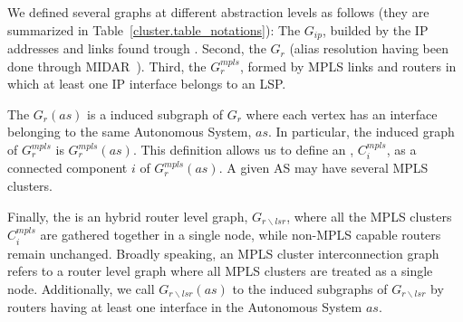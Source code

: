 We defined several graphs at different abstraction levels as follows (they are
summarized in Table~\ref{cluster.table_notations}): The  $G_{ip}$, builded
by the IP addresses and links found trough
\traceroute. Second, the  $G_{r}$ (alias resolution having been done
through MIDAR~\cite{Keys13}). Third, the  $G^{mpls}_{r}$, formed by MPLS links and routers in which at least one IP interface belongs
to an LSP.



The  $G_{r}(as)$ is a induced subgraph of $G_{r}$ where 
each vertex  has an interface belonging to the same Autonomous System, $as$. 
In particular, the induced graph of $G_r^{mpls}$ is
$G^{mpls}_{r}(as)$.  This definition allows
us to define an , $C^{mpls}_{i}$, as a connected component $i$
of $G^{mpls}_{r}(as)$. A given AS may have several MPLS clusters.


Finally, the  is an hybrid router level
graph,  $G_{r\backslash lsr}$,
where all the MPLS clusters $C^{mpls}_{i}$ are gathered together in a single
node, while non-MPLS capable routers remain unchanged.
Broadly speaking, an MPLS cluster interconnection graph refers to a router level
graph where all MPLS clusters are treated as a single node. Additionally,
we call $G_{r\backslash lsr}(as)$ to the induced
subgraphs of $G_{r\backslash lsr}$ by routers having at least one interface in
the Autonomous System $as$.


